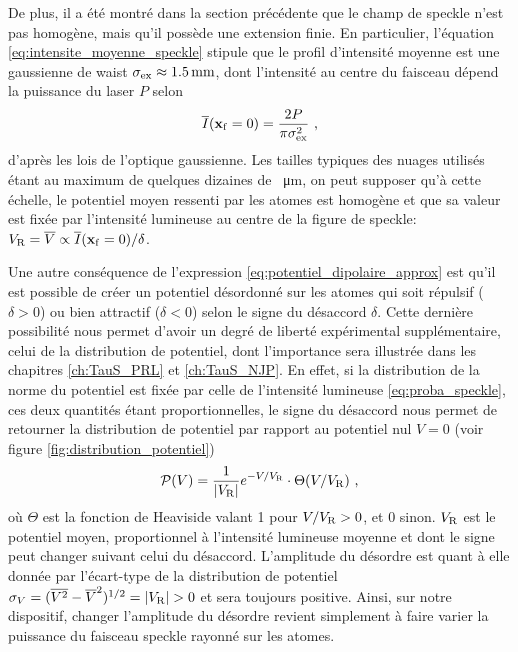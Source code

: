 De plus, il a été montré dans la section précédente que le champ de speckle n'est pas homogène, mais qu'il possède une extension finie. En particulier, l'équation \ref{eq:intensite_moyenne_speckle} stipule que le profil d'intensité moyenne est une gaussienne de waist $\sigma_{\mathrm{ex}}\approx \SI{1.5}{\milli\metre}$, dont l'intensité au centre du faisceau dépend la puissance du laser $P$ selon
\begin{equation}
\overline{I}(\mathbf{x}_{\mathrm{f}}=0)=\frac{2P}{\pi \sigma_{\mathrm{ex}}^2} \text{ ,}
\end{equation}
d'après les lois de l'optique gaussienne. Les tailles typiques des nuages utilisés étant au maximum de quelques dizaines de \SI{}{\micro\metre}, on peut supposer qu'à cette échelle, le potentiel moyen ressenti par les atomes est homogène et que sa valeur est fixée par l'intensité lumineuse au centre de la figure de speckle: $V_{\mathrm{R}}=\overline{V} \propto \overline{I}(\mathbf{x}_{\mathrm{f}}=0)/\delta$.

Une autre conséquence de l'expression \ref{eq:potentiel_dipolaire_approx} est qu'il est possible de créer un potentiel désordonné sur les atomes qui soit répulsif ($\delta>0$) ou bien attractif ($\delta<0$) selon le signe du désaccord $\delta$. Cette dernière possibilité nous permet d'avoir un degré de liberté expérimental supplémentaire, celui de la distribution de potentiel, dont l'importance sera illustrée dans les chapitres \ref{ch:TauS_PRL} et \ref{ch:TauS_NJP}. En effet, si la distribution de la norme du potentiel est fixée par celle de l'intensité lumineuse \ref{eq:proba_speckle}, ces deux quantités étant proportionnelles, le signe du désaccord nous permet de retourner la distribution de potentiel par rapport au potentiel nul $V=0$ (voir figure \ref{fig:distribution_potentiel})
\begin{equation}
\mathcal{P}(V)=\frac{1}{\left| V_{\mathrm{R}} \right|} e^{-V/V_{\mathrm{R}}} \cdot \Theta(V/V_{\mathrm{R}}) \text{ ,}
\end{equation}
où $\Theta$ est la fonction de Heaviside valant 1 pour $V/V_{\mathrm{R}}>0$, et 0 sinon. $V_{\mathrm{R}}$ est le potentiel moyen, proportionnel à l'intensité lumineuse moyenne et dont le signe peut changer suivant celui du désaccord. L'amplitude du désordre est quant à elle donnée par l'écart-type de la distribution de potentiel $ \sigma_{V}=(\overline{V^2}-\overline{V}^2)^{1/2}=\left|\VR\right|>0$ et sera toujours positive. Ainsi, sur notre dispositif, changer l'amplitude du désordre revient simplement à faire varier la puissance du faisceau speckle rayonné sur les atomes.


